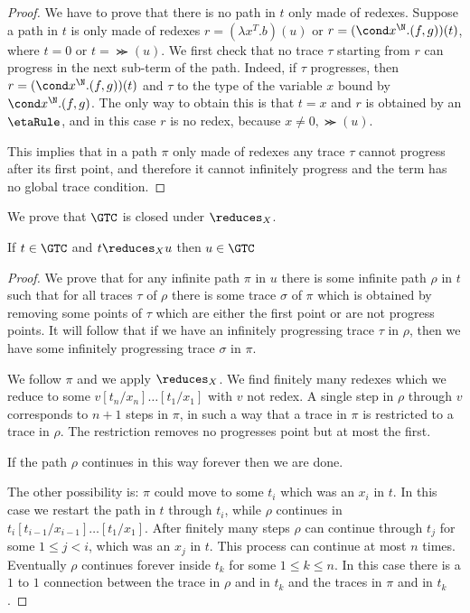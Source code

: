 \begin{proof}
We have to prove that there is no path in $t$ only made  of redexes.
Suppose a path in $t$ is only made  of redexes 
$r=(\lambda x^T.b)(u)$ or $r=(\cond x^\N.(f,g))(t)$, where $t=0$ or $t=\Succ(u)$. 
We first check that no trace $\tau$ starting from $r$ can progress in the next sub-term of the path.
Indeed, if $\tau$ progresses, then $r=(\cond x^\N.(f,g))(t)$
and $\tau$ to the type of the variable $x$ bound by $\cond x^\N.(f,g)$. 
The only way to obtain this is that $t=x$ and $r$ is obtained by an $\etaRule$,
and in this case $r$ is no redex, because $x \not = 0, \Succ(u)$.

This implies that in a path $\pi$ only made of redexes any trace $\tau$ 
cannot progress after its first point, and therefore it cannot infinitely progress and the term has
no global trace condition.
\end{proof}


We prove that $\GTC$ is closed under $\reduces_X$.


\begin{lemma}
If $t \in \GTC$ and $t \reduces_X u$ then $u \in \GTC$
\end{lemma}

\begin{proof}
We prove that for any infinite path $\pi$ in $u$ there is some infinite path $\rho$ in $t$ such that
for all traces $\tau$ of $\rho$ there is some trace $\sigma$ of $\pi$ which is obtained by
removing some points of $\tau$ which are either the first point or are not progress points. 
It will follow that if we have an infinitely progressing trace $\tau$ in $\rho$, then we have some infinitely
progressing trace $\sigma$ in $\pi$.

We follow $\pi$ and we apply $\reduces_X$. We find finitely many redexes which we reduce to
some $v[t_n/x_n]\ldots[t_1/x_1]$ with $v$ not redex. A single step in $\rho$ through $v$
corresponds to $n+1$ steps in $\pi$, in such a way that a trace in $\pi$ is restricted to a trace
in $\rho$. The restriction removes no progresses point but at most the first. 

If the path $\rho$ continues in this way forever then we are done.

The other possibility is: $\pi$ could move to some $t_i$ which was an $x_i$ in $t$. In this case we restart
the path in $t$ through $t_i$, while $\rho$ continues in $t_i[t_{i-1}/x_{i-1}]\ldots[t_1/x_1]$.
After finitely many steps $\rho$ can continue through $t_j$ for some $1 \le j < i$, which was an $x_j$
in $t$. This process can continue at most $n$ times. 
Eventually $\rho$ continues forever inside $t_k$ for some $1 \le k \le n$. In this case there is a $1$ to $1$
connection between the trace in $\rho$ and in $t_k$ and the traces in $\pi$ and in $t_k$.
\end{proof}